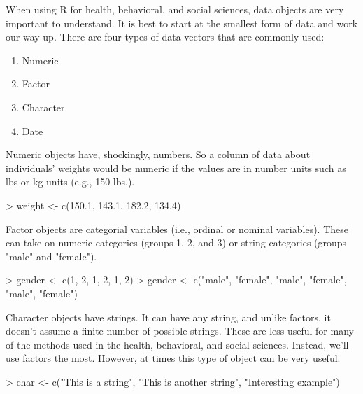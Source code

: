 \documentclass{book}
\begin{document}
When using R for health, behavioral, and social sciences, data objects are very important to understand. It is best to start at the smallest form of data and work our way up. There are four types of data vectors that are commonly used:

\begin{enumerate}
\item Numeric
\item Factor
\item Character
\item Date
\end{enumerate}

Numeric objects have, shockingly, numbers. So a column of data about individuals' weights would be numeric if the values are in number units such as lbs or kg units (e.g., 150 lbs.). 

\begin{Schunk}
\begin{Sinput}
> weight <- c(150.1, 143.1, 182.2, 134.4)
\end{Sinput}
\end{Schunk}

Factor objects are categorial variables (i.e., ordinal or nominal variables). These can take on numeric categories (groups 1, 2, and 3) or string  categories (groups "male" and "female").

\begin{Schunk}
\begin{Sinput}
> gender <- c(1, 2, 1, 2, 1, 2)
> gender <- c("male", "female", "male", "female", "male", "female")
\end{Sinput}
\end{Schunk}

Character objects have strings. It can have any string, and unlike factors, it doesn't assume a finite number of possible strings. These are less useful for many of the methods used in the health, behavioral, and social sciences. Instead, we'll use factors the most. However, at times this type of object can be very useful.

\begin{Schunk}
\begin{Sinput}
> char <- c("This is a string", "This is another string", "Interesting example")
\end{Sinput}
\end{Schunk}
\end{document}
